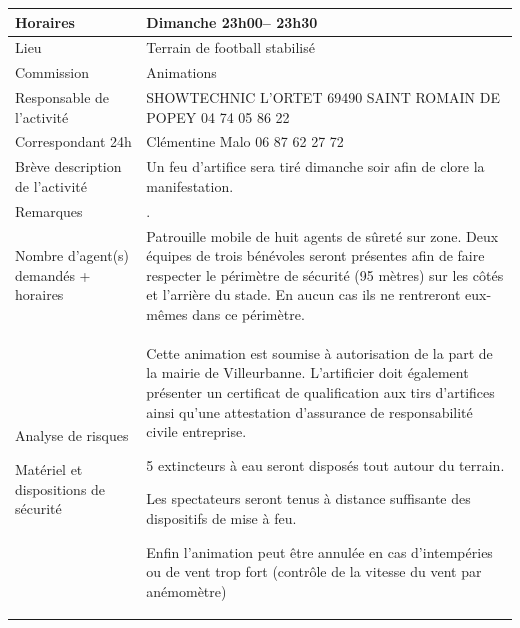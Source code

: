 \documentclass[hidelinks, paper=a4, fontsize=13pt]{report}
\begin{document}
\begin{tabular}{ | p{6cm} | p{10cm} | }
\hline
	Horaires & Dimanche 23h00– 23h30 \\ \hline
	Lieu & Terrain de football stabilisé \\ \hline
	Commission & Animations \\ \hline
	Responsable de l'activité & SHOWTECHNIC 
L'ORTET 
69490 SAINT ROMAIN DE POPEY
04 74 05 86 22 \\ \hline

	Correspondant 24h & Clémentine Malo 06 87 62 27 72 \\ \hline

	Brève description de l'activité & Un feu d’artifice sera tiré dimanche soir afin de clore la manifestation. \\ \hline

	Remarques & . \\ \hline
	Nombre d’agent(s) demandés + horaires
 & Patrouille mobile de huit agents de sûreté sur zone.
Deux équipes de trois bénévoles seront présentes afin de faire respecter le périmètre de sécurité (95 mètres) sur les côtés et l’arrière du stade. En aucun cas ils ne rentreront eux-mêmes dans ce périmètre. \\ \hline
	Analyse de risques

Matériel et dispositions de sécurité & Cette animation est soumise à autorisation de la part de la mairie de Villeurbanne. L’artificier doit également présenter un certificat de qualification aux tirs d’artifices ainsi qu’une attestation d’assurance de responsabilité civile entreprise.

5 extincteurs à eau seront disposés tout autour du terrain.

Les spectateurs seront tenus à distance suffisante des dispositifs de mise à feu.

Enfin l’animation peut être annulée en cas d’intempéries ou de vent trop fort (contrôle de la vitesse du vent par anémomètre) \\ \hline
\end{tabular}
\end{document}
